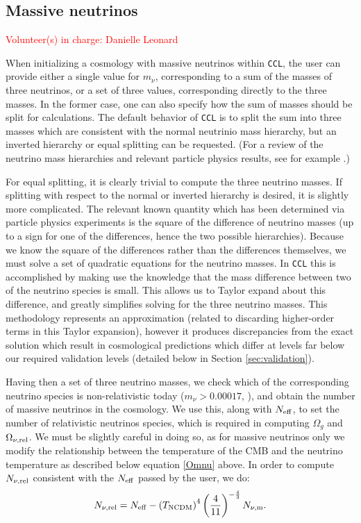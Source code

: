 \documentclass[\docopts]{\docclass}
\newcommand{\vol}[1]{\textcolor{red}{Volunteer(s) in charge: #1}}
\newcommand{\ccl}{{\tt CCL}\xspace}
\begin{document}
\subsection{Massive neutrinos}
\vol{Danielle Leonard}

When initializing a cosmology with massive neutrinos within \ccl , the user can provide either a single value for $m_\nu$, corresponding to a sum of the masses of three neutrinos, or a set of three values, corresponding directly to the three masses. In the former case, one can also specify how the sum of masses should be split for calculations. The default behavior of \ccl is to split the sum into three masses which are consistent with the normal neutrinio mass hierarchy, but an inverted hierarchy or equal splitting can be requested. (For a review of the neutrino mass hierarchies and relevant particle physics results, see for example \cite{Gerbino2017, Lesgourgues2012}.)

For equal splitting, it is clearly trivial to compute the three neutrino masses. If splitting with respect to the normal or inverted hierarchy is desired, it is slightly more complicated. The relevant known quantity which has been determined via particle physics experiments is the square of the difference of neutrino masses (up to a sign for one of the differences, hence the two possible hierarchies). Because we know the square of the differences rather than the differences themselves, we must solve a set of quadratic equations for the neutrino masses. In \ccl this is accomplished by making use the knowledge that the mass difference between two of the neutrino species is small. This allows us to Taylor expand about this difference, and greatly simplifies solving for the three neutrino masses. This methodology represents an approximation (related to discarding higher-order terms in this Taylor expansion), however it produces discrepancies from the exact solution which result in cosmological predictions which differ at levels far below our required validation levels (detailed below in Section \ref{sec:validation}).

Having then a set of three neutrino masses, we check which of the corresponding neutrino species is non-relativistic today ($m_\nu>0.00017$, \citealt{Lesgourgues2012}), and obtain the number of massive neutrinos in the cosmology. We use this, along with $N_{\rm eff}$, to set the number of relativistic neutrinos species, which is required in computing $\Omega_g$ and $\Omega_{\nu, {\rm rel}}$. We must be slightly careful in doing so, as for massive neutrinos only we modify the relationship between the temperature of the CMB and the neutrino temperature as described below equation \ref{Omnu} above. In order to compute $N_{\nu, {\rm rel}}$  consistent with the $N_{\rm eff}$ passed by the user, we do:
\begin{equation}
N_{\nu, {\rm rel}} = N_{\rm eff} - \left(T_{\rm NCDM}\right)^{4} \left(\frac{4}{11}\right)^{-\frac{4}{3}} N_{\nu, {\rm m}}.
\label{Nnurel}
\end{equation}
\end{document}
